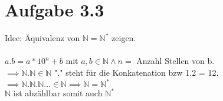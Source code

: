 \documentclass{article}
\begin{document}
	 \section[a 3.3]{Aufgabe 3.3}
	 Idee: Äquivalenz von $\mathbb{N} = \mathbb{N}^*$ zeigen.\\\\
	 $a.b = a*10^n+b$ mit $a,b \in \mathbb{N} \land n = $ Anzahl Stellen von b.\\
	 $\implies \mathbb{N}.\mathbb{N} \in \mathbb{N}$ "." steht für die Konkatenation bzw 1.2 = 12.\\
	 $\implies \mathbb{N}.\mathbb{N}.\mathbb{N}... \in \mathbb{N} \implies \mathbb{N} = \mathbb{N}^*$ \\
	 $\mathbb{N}$ ist abzählbar somit auch $\mathbb{N}^*$
	 
\end{document}
